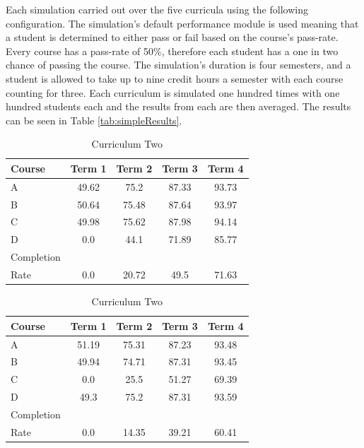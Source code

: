 \documentclass[botnum, fleqn]{unmeethesis}
\begin{document}
Each simulation carried out over the five curricula using the following configuration. The simulation's default performance module is used meaning that a student is determined to either pass or fail based on the course's pass-rate. Every course has a pass-rate of 50\%, therefore each student has a one in two chance of passing the course. The simulation's duration is four semesters, and a student is allowed to take up to nine credit hours a semester with each course counting for three. Each curriculum is simulated one hundred times with one hundred students each and the results from each are then averaged. The results can be seen in Table \ref{tab:simpleResults}.

\begin{table}[!h]
  \tiny
  \caption{}
  \begin{subtable}{0.45\linewidth}
    \centering
      \caption{Curriculum One}
      \label{tab:simple4}
      \begin{tabular}{l*{4}{c}}
        Course  & Term 1 & Term 2 & Term 3 & Term 4 \\
        \hline
        A       & 49.62 & 75.2  & 87.33 & 93.73 \\
        B       & 50.64 & 75.48 & 87.64 & 93.97 \\
        C       & 49.98 & 75.62 & 87.98 & 94.14 \\
        D       & 0.0 & 44.1 & 71.89 & 85.77 \\
        \hline
        Completion \\ Rate & 0.0 & 20.72 & 49.5 & 71.63
      \end{tabular}
  \end{subtable}\hfill
  \begin{subtable}{0.45\linewidth}
    \centering
      \caption{Curriculum Two}
      \label{tab:simple7}
      \begin{tabular}{l*{4}{c}}
        Course  & Term 1 & Term 2 & Term 3 & Term 4 \\
        \hline
        A       & 51.19 & 75.31 & 87.23 & 93.48 \\
        B       & 49.94 & 74.71 & 87.31 & 93.45 \\
        C       & 0.0   & 25.5  & 51.27 & 69.39 \\
        D       & 49.3  & 75.2  & 87.31 & 93.59 \\
        \hline
        Completion \\ Rate & 0.0 & 14.35 & 39.21 & 60.41 \\
      \end{tabular}
  \end{subtable}


\end{table}
\end{document}
